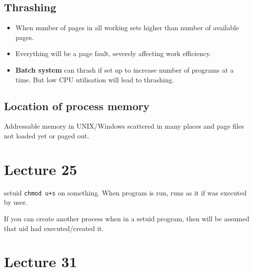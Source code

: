 \documentclass{article}
\begin{document}
	\subsection{Thrashing}
		\begin{itemize}
			\item When number of pages in all working sets higher than number of available pages.
			\item Everything will be a page fault, severely affecting work efficiency.
			\item \textbf{Batch system} can thrash if set up to increase number of programs at a time. But low CPU utilisation will lead to thrashing.
		\end{itemize}
		
	\subsection{Location of process memory}
		Addressable memory in UNIX/Windows scattered in many places and page files not loaded yet or paged out.
		
		
		

		
		

\section{Lecture 25}
	
	setuid
	\texttt{chmod u+s} on something. When program is run, runs as it if was executed by user.

	If you can create another process when in a setuid program, then will be assumed that uid had executed/created it.
	
	
\section{Lecture 31}
	
\end{document}
